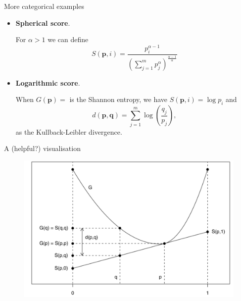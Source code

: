 \begin{frame}{More categorical examples}
\begin{itemize}
 \item \textbf{Spherical score}. 
 
 For $\alpha >1$ we can define
 \begin{equation}
  S(\boldsymbol{p}, i) = \frac{p_i^{\alpha -1}}{\left(\sum_{j=1}^m p_j^\alpha\right)^{\frac{\alpha-1}{\alpha}}}
 \end{equation}
\item \textbf{Logarithmic score}.

When $G(\boldsymbol{p}) = $ is the Shannon entropy, we have $S(\boldsymbol{p}, i) = \log p_i$ and 
\begin{equation}
 d(\boldsymbol{p}, \boldsymbol{q}) = \sum_{j=1}^m \log\left(\frac{q_j}{p_j}\right),
\end{equation}
as the Kullback-Leibler divergence.
\end{itemize}
\end{frame}
\begin{frame}{A (helpful?) visualisation}
\begin{figure}
 \begin{center}
  \includegraphics[scale=0.42]{figures/generalised_entropy.pdf}
 \end{center}
\end{figure}
\end{frame}
